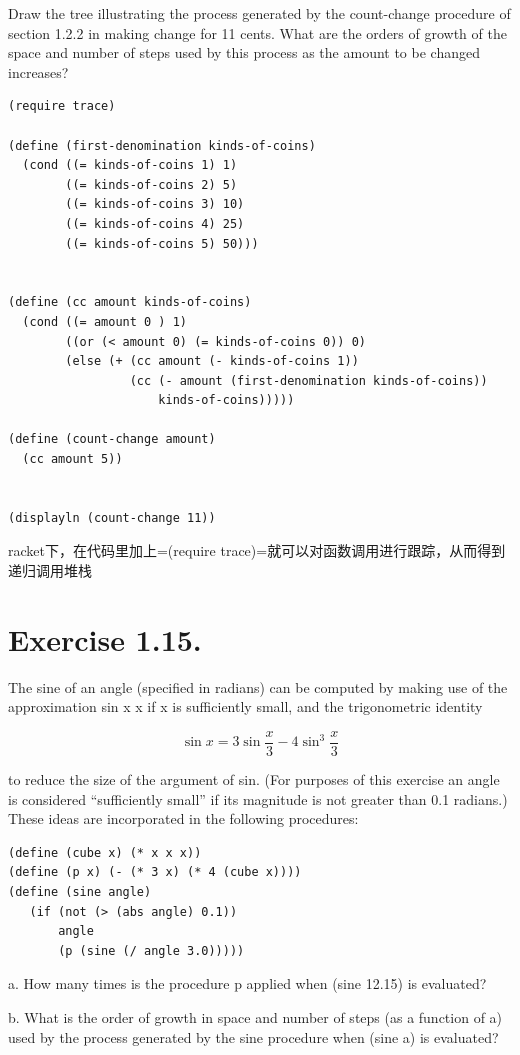 \documentclass[11pt]{article}
\begin{document}
  Draw the tree illustrating the process generated by the count-change procedure
  of section 1.2.2 in making change for 11 cents. What are the orders of growth
  of the space and number of steps used by this process as the amount to be
  changed increases?



\begin{verbatim}
(require trace)

(define (first-denomination kinds-of-coins)
  (cond ((= kinds-of-coins 1) 1)
        ((= kinds-of-coins 2) 5)
        ((= kinds-of-coins 3) 10)
        ((= kinds-of-coins 4) 25)
        ((= kinds-of-coins 5) 50)))


(define (cc amount kinds-of-coins)
  (cond ((= amount 0 ) 1)
        ((or (< amount 0) (= kinds-of-coins 0)) 0)
        (else (+ (cc amount (- kinds-of-coins 1))
                 (cc (- amount (first-denomination kinds-of-coins))
                     kinds-of-coins)))))

(define (count-change amount)
  (cc amount 5))


(displayln (count-change 11))
\end{verbatim}

racket下，在代码里加上=(require trace)=就可以对函数调用进行跟踪，从而得到递归调用堆栈
\section{Exercise 1.15.}
\label{sec-15}

  The sine of an angle (specified in radians) can be computed by making use of
  the approximation sin x  x if x is sufficiently small, and the trigonometric
  identity

\begin{equation}
\sin x = 3\sin \frac{x}{3} - 4\sin^3\frac{x}{3}
\end{equation}

  to reduce the size of the argument of sin. (For purposes of this exercise an
  angle is considered ``sufficiently small'' if its magnitude is not greater than
  0.1 radians.) These ideas are incorporated in the following procedures:


\begin{verbatim}
(define (cube x) (* x x x))
(define (p x) (- (* 3 x) (* 4 (cube x))))
(define (sine angle)
   (if (not (> (abs angle) 0.1))
       angle
       (p (sine (/ angle 3.0)))))
\end{verbatim}

a.  How many times is the procedure p applied when (sine 12.15) is evaluated?

b.  What is the order of growth in space and number of steps
(as a function of a) used by the process generated by the sine procedure when
(sine a) is evaluated?
\end{document}
